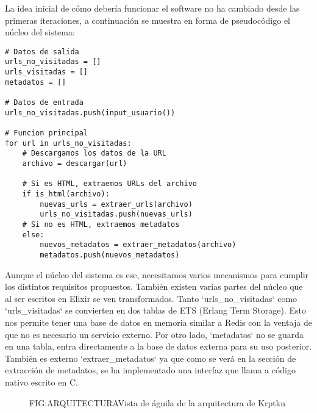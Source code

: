 La idea inicial de cómo debería funcionar el software no ha cambiado desde las primeras iteraciones, a continuación se muestra en forma de pseudocódigo el núcleo del sistema:

\begin{verbatim}
# Datos de salida
urls_no_visitadas = []
urls_visitadas = []
metadatos = []

# Datos de entrada
urls_no_visitadas.push(input_usuario())

# Funcion principal
for url in urls_no_visitadas:
    # Descargamos los datos de la URL
    archivo = descargar(url)
    
    # Si es HTML, extraemos URLs del archivo
    if is_html(archivo):
        nuevas_urls = extraer_urls(archivo)
        urls_no_visitadas.push(nuevas_urls)
    # Si no es HTML, extraemos metadatos
    else:
        nuevos_metadatos = extraer_metadatos(archivo)
        metadatos.push(nuevos_metadatos)

\end{verbatim}

Aunque el núcleo del sistema es ese, necesitamos varios mecanismos para cumplir los distintos requisitos propuestos. También existen varias partes del núcleo que al ser escritos en Elixir se ven transformados. Tanto `urls\_no\_visitadas` como `urls\_visitadas` se convierten en dos tablas de ETS (Erlang Term Storage). Esto nos permite tener una base de datos en memoria similar a Redis con la ventaja de que no es necesario un servicio externo. Por otro lado, `metadatos` no se guarda en una tabla, entra directamente a la base de datos externa para su uso posterior. También es externo `extraer\_metadatos` ya que como se verá en la sección de extracción de metadatos, se ha implementado una interfaz que llama a código nativo escrito en C.

\begin{figure}[Arquitectura general de Krptkn]{FIG:ARQUITECTURA}{Vista de águila de la arquitectura de Krptkn}
\end{figure}